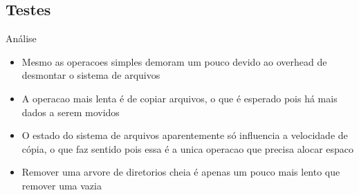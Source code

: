 \documentclass{beamer}
\begin{document}
\subsection{Testes}
\begin{frame}{Análise}
\begin{itemize}
\setlength\itemsep{1em}
\item Mesmo as operacoes simples demoram um pouco devido ao overhead de desmontar o sistema de arquivos
\item A operacao mais lenta é de copiar arquivos, o que é esperado pois há mais dados a serem movidos
\item O estado do sistema de arquivos aparentemente só influencia a velocidade de cópia, o que faz sentido pois essa é a unica operacao que precisa alocar espaco
\item Remover uma arvore de diretorios cheia é apenas um pouco mais lento que remover uma vazia
\end{itemize}
\end{frame}
\end{document}
